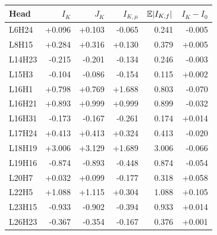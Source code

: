 \begin{tabular}{lrrrrr}
\toprule
Head & $I_{K}$ & $J_{K}$ & $I_{K,\mu}$ & $\mathbb{E}|I_{K,f}|$ & $I_K-I_0$ \\
\midrule
L6H24 & +0.096 & +0.103 & -0.065 & 0.241 & -0.005 \\
L8H15 & +0.284 & +0.316 & +0.130 & 0.379 & +0.005 \\
L14H23 & -0.215 & -0.201 & -0.134 & 0.246 & -0.003 \\
L15H3 & -0.104 & -0.086 & -0.154 & 0.115 & +0.002 \\
L16H1 & +0.798 & +0.769 & +1.688 & 0.803 & -0.070 \\
L16H21 & +0.893 & +0.999 & +0.999 & 0.899 & -0.032 \\
L16H31 & -0.173 & -0.167 & -0.261 & 0.174 & +0.014 \\
L17H24 & +0.413 & +0.413 & +0.324 & 0.413 & -0.020 \\
L18H19 & +3.006 & +3.129 & +1.689 & 3.006 & -0.066 \\
L19H16 & -0.874 & -0.893 & -0.448 & 0.874 & -0.054 \\
L20H7 & +0.032 & +0.099 & -0.177 & 0.318 & +0.058 \\
L22H5 & +1.088 & +1.115 & +0.304 & 1.088 & +0.105 \\
L23H15 & -0.933 & -0.902 & -0.394 & 0.933 & +0.014 \\
L26H23 & -0.367 & -0.354 & -0.167 & 0.376 & +0.001 \\
\bottomrule
\end{tabular}
